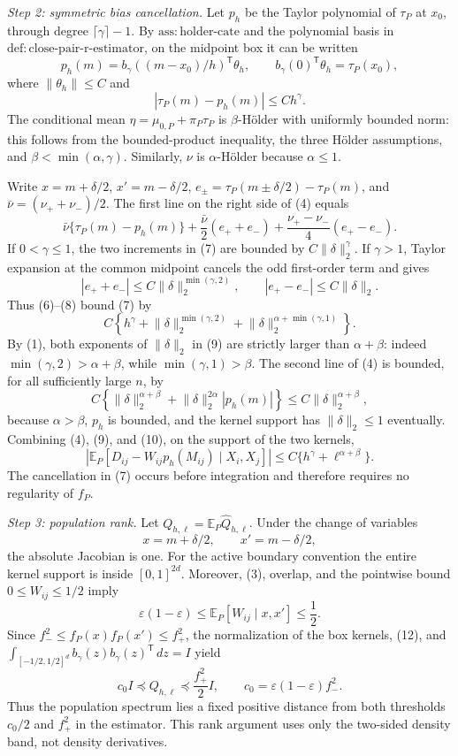 \emph{Step 2: symmetric bias cancellation.}
Let \(p_h\) be the Taylor polynomial of \(\tau_P\) at \(x_0\), through
degree \(\lceil\gamma\rceil-1\).  By
\(\mathrm{ass:holder\mbox{-}cate}\) and the polynomial basis in
\(\mathrm{def:close\mbox{-}pair\mbox{-}r\mbox{-}estimator}\), on the
midpoint box it can be written
\[
p_h(m)=b_\gamma((m-x_0)/h)^{\mathsf T}\theta_h,
\qquad
b_\gamma(0)^{\mathsf T}\theta_h=\tau_P(x_0),
\tag{5}
\]
where \(\lVert\theta_h\rVert\leq C\) and
\[
|\tau_P(m)-p_h(m)|\leq Ch^\gamma.
\tag{6}
\]
The conditional mean \(\eta=\mu_{0,P}+\pi_P\tau_P\) is
\(\beta\)-H\"older with uniformly bounded norm: this follows from the
bounded-product inequality, the three H\"older assumptions, and
\(\beta<\min(\alpha,\gamma)\).  Similarly, \(\nu\) is
\(\alpha\)-H\"older because \(\alpha\leq1\).

Write \(x=m+\delta/2\), \(x'=m-\delta/2\),
\(e_\pm=\tau_P(m\pm\delta/2)-\tau_P(m)\), and
\(\bar\nu=(\nu_++\nu_-)/2\).  The first line on the right side of (4)
equals
\[
\bar\nu\{\tau_P(m)-p_h(m)\}
+\frac{\bar\nu}{2}(e_++e_-)
+\frac{\nu_+-\nu_-}{4}(e_+-e_-).
\tag{7}
\]
If \(0<\gamma\leq1\), the two increments in (7) are bounded by
\(C\lVert\delta\rVert_2^\gamma\).  If \(\gamma>1\), Taylor expansion at
the common midpoint cancels the odd first-order term and gives
\[
|e_++e_-|\leq C\lVert\delta\rVert_2^{\min(\gamma,2)},
\qquad
|e_+-e_-|\leq C\lVert\delta\rVert_2.
\tag{8}
\]
Thus (6)--(8) bound (7) by
\[
C\left\{h^\gamma
+\lVert\delta\rVert_2^{\min(\gamma,2)}
+\lVert\delta\rVert_2^{\alpha+\min(\gamma,1)}\right\}.
\tag{9}
\]
By (1), both exponents of \(\lVert\delta\rVert_2\) in (9) are strictly
larger than \(\alpha+\beta\): indeed
\(\min(\gamma,2)>\alpha+\beta\), while
\(\min(\gamma,1)>\beta\).  The second line of (4) is bounded, for all
sufficiently large \(n\), by
\[
C\left\{
\lVert\delta\rVert_2^{\alpha+\beta}
+\lVert\delta\rVert_2^{2\alpha}|p_h(m)|
\right\}
\leq C\lVert\delta\rVert_2^{\alpha+\beta},
\tag{10}
\]
because \(\alpha>\beta\), \(p_h\) is bounded, and the kernel support has
\(\lVert\delta\rVert_2\leq1\) eventually.  Combining (4), (9), and
(10), on the support of the two kernels,
\[
\left|\mathbb E_P[D_{ij}-W_{ij}p_h(M_{ij})\mid X_i,X_j]\right|
\leq C\{h^\gamma+\ell^{\alpha+\beta}\}.
\tag{11}
\]
The cancellation in (7) occurs before integration and therefore requires no
regularity of \(f_P\).

\emph{Step 3: population rank.}
Let \(Q_{h,\ell}=\mathbb E_P\widehat Q_{h,\ell}\).  Under the change of
variables
\[
x=m+\delta/2,
\qquad x'=m-\delta/2,
\tag{12}
\]
the absolute Jacobian is one.  For the active boundary convention the entire
kernel support is inside \([0,1]^{2d}\).  Moreover, (3), overlap, and the
pointwise bound \(0\leq W_{ij}\leq1/2\) imply
\[
\varepsilon(1-\varepsilon)
\leq\mathbb E_P[W_{ij}\mid x,x']\leq\frac12.
\tag{13}
\]
Since \(f_-^2\leq f_P(x)f_P(x')\leq f_+^2\), the normalization of the
box kernels, (12), and
\(\int_{[-1/2,1/2]^d}b_\gamma(z)b_\gamma(z)^{\mathsf T}\,dz=I\)
yield
\[
c_0 I\preceq Q_{h,\ell}\preceq\frac{f_+^2}{2}I,
\qquad c_0=\varepsilon(1-\varepsilon)f_-^2.
\tag{14}
\]
Thus the population spectrum lies a fixed positive distance from both
thresholds \(c_0/2\) and \(f_+^2\) in the estimator.  This rank argument
uses only the two-sided density band, not density derivatives.

